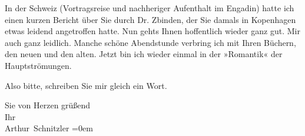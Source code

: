 \pstart
           In der Schweiz (Vortragsreise und nachheriger
               Aufenthalt im Engadin) {\pb}hatte ich einen kurzen Bericht über Sie durch Dr.
                  Zbinden, der Sie damals in Kopenhagen etwas leidend angetroffen hatte. Nun
               gehts Ihnen hoffentlich wieder ganz gut. Mir auch ganz leidlich. Manche  schöne Abendstunde verbring ich mit Ihren Büchern,
               den neuen und den alten. Jetzt bin ich wieder einmal in der »Romantik« der Hauptströmungen.\pend
           
\pstart
           Also bitte, schreiben Sie mir gleich ein Wort.\pend
           
\pstart
           Sie von Herzen grüßend{\\[\baselineskip]}Ihr{\\[\baselineskip]}\spacefill\mbox{Arthur Schnitzler}\pend
           \leftskip=0em{}\endnumbering{}  \newcommand{\dateiname}{L02432}\newcommand{\titel}{Arthur Schnitzler an Georg Brandes, 11. 2. 1925}\newcommand{\editorInnen}{Martin Anton Müller und Gerd-Hermann Susen}
